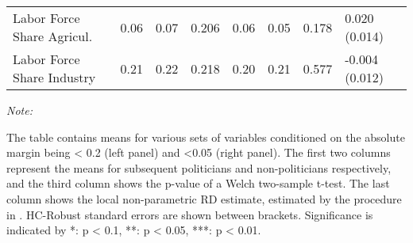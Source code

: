 \begin{table}[!h]
{\begin{threeparttable}
\begin{tabular}[t]{llllllll}
\hspace{1em}Labor Force Share Agricul. & \num{0.06} & \num{0.07} & 0.206 & \num{0.06} & \num{0.05} & 0.178 & 0.020 (0.014)\\
\hspace{1em}Labor Force Share Industry & \num{0.21} & \num{0.22} & 0.218 & \num{0.20} & \num{0.21} & 0.577 & -0.004 (0.012)\\
\bottomrule
\end{tabular}
\begin{tablenotes}[para]
\item \textit{Note: } 
\item The table contains means for various sets of variables conditioned on the absolute margin being < 0.2 (left panel) and <0.05 (right panel). The first two columns represent the means for subsequent politicians and non-politicians respectively, and the third column shows the p-value of a Welch two-sample t-test. The last column shows the local non-parametric RD estimate, estimated by the procedure in \cite{cattaneo2019practical}. HC-Robust standard errors are shown between brackets. Significance is indicated by *: p < 0.1, **: p < 0.05, ***: p < 0.01.
\end{tablenotes}
\end{threeparttable}}
\end{table}
